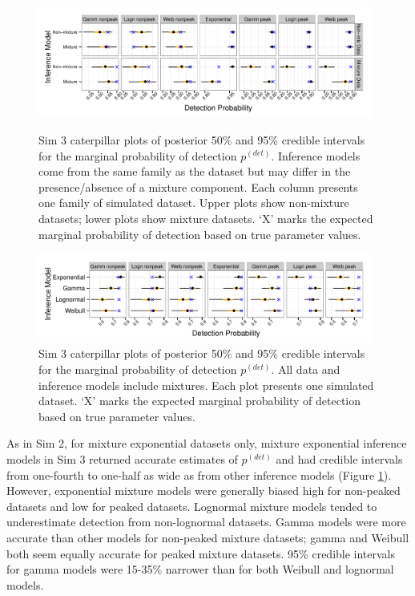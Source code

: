 \documentclass[useAMS,usenatbib,referee,12pt]{article}
\begin{document}
\begin{figure}[h!]\centering
\includegraphics[width=0.98\textwidth]{Sims/SimFull/pdet_cater_correct.pdf}
\caption{\label{pdet_cater_correct} Sim 3 caterpillar plots of posterior 50\% and 95\% credible intervals for the marginal probability of detection $p^{(det)}$.  Inference models come from the same family as the dataset but may differ in the presence/absence of a mixture component.  Each column presents one family of simulated dataset.  Upper plots show non-mixture datasets; lower plots show mixture datasets.  `X' marks the expected marginal probability of detection based on true parameter values.}
\includegraphics[width=0.98\textwidth]{Sims/SimFull/pdet_cater_family.pdf}
\caption{\label{pdet_cater_family}  Sim 3 caterpillar plots of posterior 50\% and 95\% credible intervals for the marginal probability of detection $p^{(det)}$. All data and inference models include mixtures.  Each plot presents one simulated dataset.  `X' marks the expected marginal probability of detection based on true parameter values.}
\end{figure}

As in Sim 2, for mixture exponential datasets only, mixture exponential inference models in Sim 3 returned accurate estimates of $p^{(det)}$ and had credible intervals from one-fourth to one-half as wide as from other inference models (Figure \ref{pdet_cater_family}).  However, exponential mixture models were generally biased high for non-peaked datasets and low for peaked datasets.  Lognormal mixture models tended to underestimate detection from non-lognormal datasets.  Gamma models were more accurate than other models for non-peaked mixture datasets; gamma and Weibull both seem equally accurate for peaked mixture datasets.  95\% credible intervals for gamma models were 15-35\% narrower than for both Weibull and lognormal models.
\end{document}
